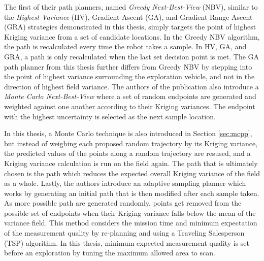 The first of their path planners, named \textit{Greedy Next-Best-View} (NBV), similar to the \textit{Highest Variance} (HV), Gradient Ascent (GA), and Gradient Range Ascent (GRA) strategies demonstrated in this thesis, simply targets the point of highest Kriging variance from a set of candidate locations. In the Greedy NBV algorithm, the path is recalculated every time the robot takes a sample. In HV, GA, and GRA, a path is only recalculated when the last set decision point is met. The GA path planner from this thesis further differs from Greedy NBV by stepping into the point of highest variance surrounding the exploration vehicle, and not in the direction of highest field variance. The authors of the publication also introduce a \textit{Monte Carlo Next-Best-View} where a set of random endpoints are generated and weighted against one another according to their Kriging variances. The endpoint with the highest uncertainty is selected as the next sample location. 

In this thesis, a Monte Carlo technique is also introduced in Section \ref{sec:mcpp}, but instead of weighing each proposed random trajectory by its Kriging variance, the predicted values of the points along a random trajectory are resused, and a Kriging variance calculation is run on the field again. The path that is ultimately chosen is the path which reduces the expected overall Kriging variance of the field as a whole. Lastly, the authors introduce an adaptive sampling planner which works by generating an initial path that is then modified after each sample taken. As more possible path are generated randomly, points get removed from the possible set of endpoints when their Kriging variance falls below the mean of the variance field. This method considers the mission time and minimum expectation of the measurement quality by re-planning and using a Traveling Salesperson (TSP) algorithm. In this thesis, minimum expected measurement quality is set before an exploration by tuning the maximum allowed area to scan.